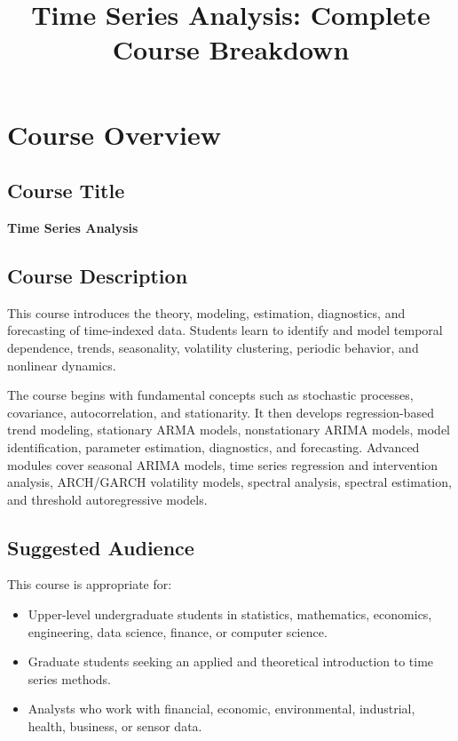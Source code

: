 \documentclass[11pt]{article}
\title{\textbf{Time Series Analysis: Complete Course Breakdown}}
\author{}
\date{}
\begin{document}
\maketitle

\section{Course Overview}

\subsection{Course Title}
\textbf{Time Series Analysis}

\subsection{Course Description}

This course introduces the theory, modeling, estimation, diagnostics, and forecasting of time-indexed data. Students learn to identify and model temporal dependence, trends, seasonality, volatility clustering, periodic behavior, and nonlinear dynamics.

The course begins with fundamental concepts such as stochastic processes, covariance, autocorrelation, and stationarity. It then develops regression-based trend modeling, stationary ARMA models, nonstationary ARIMA models, model identification, parameter estimation, diagnostics, and forecasting. Advanced modules cover seasonal ARIMA models, time series regression and intervention analysis, ARCH/GARCH volatility models, spectral analysis, spectral estimation, and threshold autoregressive models.

\subsection{Suggested Audience}

This course is appropriate for:
\begin{itemize}
    \item Upper-level undergraduate students in statistics, mathematics, economics, engineering, data science, finance, or computer science.
    \item Graduate students seeking an applied and theoretical introduction to time series methods.
    \item Analysts who work with financial, economic, environmental, industrial, health, business, or sensor data.
\end{itemize}
\end{document}

